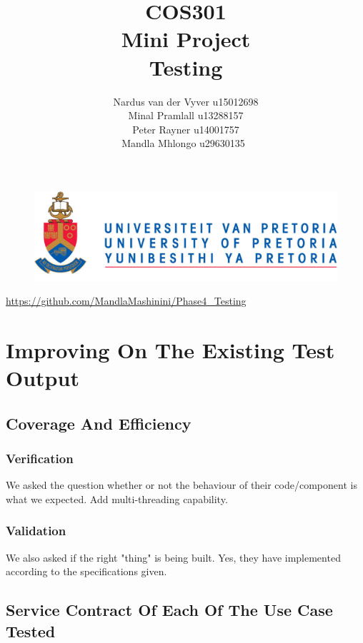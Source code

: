 \documentclass[12pt]{article}
\begin{document}
	

	\begin{figure}
		\includegraphics[width=\linewidth]{logo.jpg}	
	\end{figure}

	\title 	{
				COS301\\
				Mini Project\\
				Testing
		   	}
	\author {
				Nardus van der Vyver u15012698\\
				Minal Pramlall u13288157\\
				Peter Rayner u14001757\\
				Mandla Mhlongo u29630135\
			}
	\maketitle
	\begin{center}
			\url{https://github.com/MandlaMashinini/Phase4_Testing}	
	\end{center}
	\newpage
	\tableofcontents
	\newpage
	\section{Improving On The Existing Test Output}
	\subsection{Coverage And Efficiency}
	\subsubsection{Verification}
	We asked the question whether or not the behaviour of their code/component is what we expected. Add multi-threading capability.
	\subsubsection{Validation}  
	We also asked if the right "thing" is being built. Yes, they have implemented according to the specifications given.
	\subsection{Service Contract Of Each Of The Use Case Tested}
	
\end{document}

